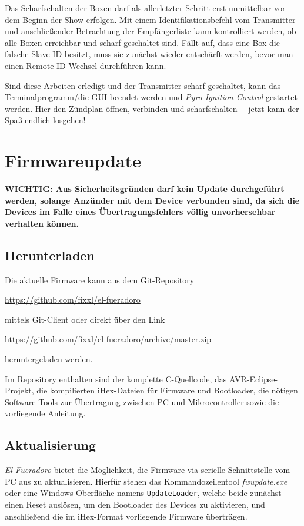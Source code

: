 \documentclass[paper=a4, parskip, numbers=noenddot, toc=listof, headsepline]{scrbook}
\newcommand{\pic}{\emph{Pyro Ignition Control}}
\newcommand{\anlage}{\emph{El Fueradoro}}
\begin{document}
			Das Scharfschalten der Boxen darf als allerletzter Schritt erst unmittelbar vor dem Beginn der Show erfolgen. Mit einem Identifikationsbefehl vom Transmitter und anschließender Betrachtung der Empfängerliste kann kontrolliert werden, ob alle Boxen erreichbar und scharf geschaltet sind. Fällt auf, dass eine Box die falsche Slave-ID besitzt, muss sie zunächst wieder entschärft werden, bevor man einen Remote-ID-Wechsel durchführen kann.

			Sind diese Arbeiten erledigt und der Transmitter scharf geschaltet, kann das Terminalprogramm/die GUI beendet werden und {\pic} gestartet werden. Hier den Zündplan öffnen, verbinden und scharfschalten~-- jetzt kann der Spaß endlich losgehen!

	\chapter{Firmwareupdate}
		\label{ch:firmwareupdate}

		\textbf{WICHTIG: Aus Sicherheitsgründen darf kein Update durchgeführt werden, solange Anzünder mit dem Device verbunden sind, da sich die Devices im Falle eines Übertragungsfehlers völlig unvorhersehbar verhalten können.}

		\section{Herunterladen}

			Die aktuelle Firmware kann aus dem Git-Repository
			\begin{center}\url{https://github.com/fixxl/el-fueradoro}\end{center}
			mittels Git-Client oder direkt über den Link
			\begin{center}\url{https://github.com/fixxl/el-fueradoro/archive/master.zip}\end{center}
			heruntergeladen werden.

			Im Repository enthalten sind der komplette C-Quellcode, das AVR-Eclipse-Projekt, die kom\-pilierten iHex-Dateien für Firmware und Bootloader, die nötigen Software-Tools zur Übertragung zwischen PC und Mikrocontroller sowie die vorliegende Anleitung.

		\section{Aktualisierung}

			{\anlage} bietet die Möglichkeit, die Firmware via serielle Schnittstelle vom PC aus zu aktualisieren. Hierfür stehen das Kommandozeilentool \emph{fwupdate.exe} oder eine Windows-Oberfläche namens \texttt{UpdateLoader}, welche beide zunächst einen Reset auslösen, um den Bootloader des Devices zu aktivieren, und anschließend die im iHex-Format vorliegende Firmware überträgen.
\end{document}
